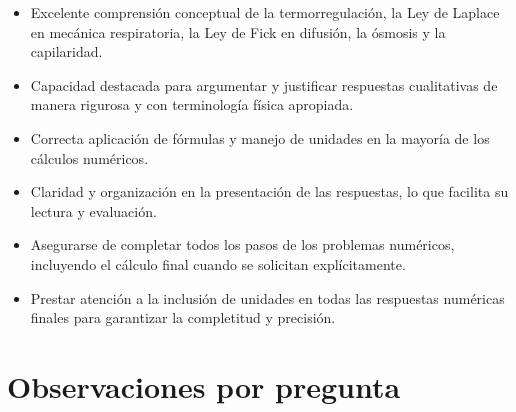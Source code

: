 \documentclass[11pt,a4paper]{article}
\begin{document}
\vspace{4pt}
\begin{minipage}[t]{0.48\linewidth}
  \begin{tcolorbox}[cajaFortaleza, title={Fortalezas}]
\begin{itemize}[leftmargin=1.5em, itemsep=2pt]
  \item Excelente comprensión conceptual de la termorregulación, la Ley de Laplace en mecánica respiratoria, la Ley de Fick en difusión, la ósmosis y la capilaridad.
  \item Capacidad destacada para argumentar y justificar respuestas cualitativas de manera rigurosa y con terminología física apropiada.
  \item Correcta aplicación de fórmulas y manejo de unidades en la mayoría de los cálculos numéricos.
  \item Claridad y organización en la presentación de las respuestas, lo que facilita su lectura y evaluación.
\end{itemize}
  \end{tcolorbox}
\end{minipage}
\hfill
\begin{minipage}[t]{0.48\linewidth}
  \begin{tcolorbox}[cajaMejora, title={Areas de mejora}]
\begin{itemize}[leftmargin=1.5em, itemsep=2pt]
  \item Asegurarse de completar todos los pasos de los problemas numéricos, incluyendo el cálculo final cuando se solicitan explícitamente.
  \item Prestar atención a la inclusión de unidades en todas las respuestas numéricas finales para garantizar la completitud y precisión.
\end{itemize}
  \end{tcolorbox}
\end{minipage}

\section*{Observaciones por pregunta}
\end{document}
